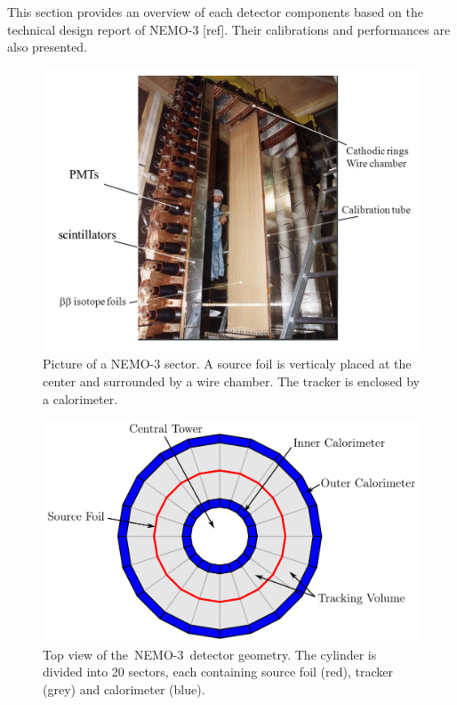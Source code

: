 \documentclass[main.tex]{subfiles}
\begin{document}
\NI This section provides an overview of each detector components based on the technical design report of NEMO-3 [ref]. Their calibrations and performances are also presented.  




\begin{figure}[h!]
\begin{center}
\includegraphics[scale=0.55]{pictures/Chap2/sector.jpg}
\caption{Picture of a NEMO-3 sector. A source foil is verticaly placed at the center and surrounded by a wire chamber. The tracker is enclosed by a calorimeter.}
\label{NEMO3SectorPictures}
\end{center}
\end{figure}


\begin{figure}[h!]
\begin{center}
\includegraphics[scale=0.25]{pictures/Chap2/TopViewNEMO3.png}
\caption{Top view of the~NEMO-3~detector geometry. The cylinder is divided into 20 sectors, each containing source foil (red), tracker (grey) and calorimeter (blue).}
\label{TopViewNEMO3}
\end{center}
\end{figure}
\end{document}
